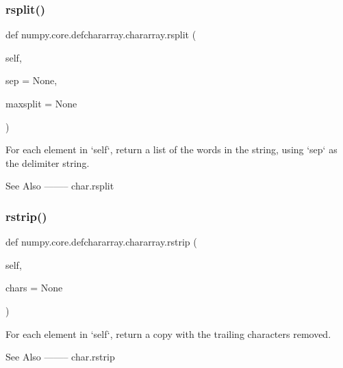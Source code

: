 \subsubsection{\texorpdfstring{rsplit()}{rsplit()}}
{\footnotesize\ttfamily def numpy.\+core.\+defchararray.\+chararray.\+rsplit (\begin{DoxyParamCaption}\item[{}]{self,  }\item[{}]{sep = {\ttfamily None},  }\item[{}]{maxsplit = {\ttfamily None} }\end{DoxyParamCaption})}

\begin{DoxyVerb}For each element in `self`, return a list of the words in
the string, using `sep` as the delimiter string.

See Also
--------
char.rsplit\end{DoxyVerb}
 \mbox{\label{classnumpy_1_1core_1_1defchararray_1_1chararray_a91e16fcd364e57033e050cbaaefb82fa}} 
\subsubsection{\texorpdfstring{rstrip()}{rstrip()}}
{\footnotesize\ttfamily def numpy.\+core.\+defchararray.\+chararray.\+rstrip (\begin{DoxyParamCaption}\item[{}]{self,  }\item[{}]{chars = {\ttfamily None} }\end{DoxyParamCaption})}

\begin{DoxyVerb}For each element in `self`, return a copy with the trailing
characters removed.

See Also
--------
char.rstrip\end{DoxyVerb}
 \mbox{\label{classnumpy_1_1core_1_1defchararray_1_1chararray_a163dba03d78e503f0e64484dc9b2e2ec}} 
